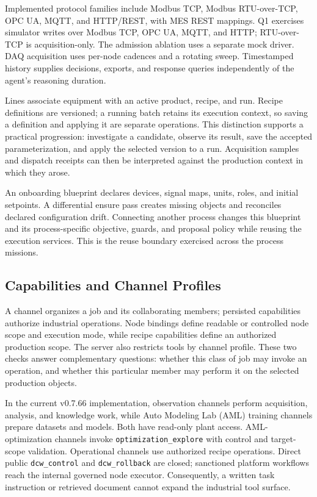 Implemented protocol families include Modbus TCP, Modbus RTU-over-TCP,
OPC UA, MQTT, and HTTP/REST, with MES REST mappings. Q1 exercises simulator
writes over Modbus TCP, OPC UA, MQTT, and HTTP; RTU-over-TCP is
acquisition-only. The admission ablation uses a separate mock driver.
DAQ acquisition uses per-node cadences and a rotating sweep. Timestamped
history supplies decisions, exports, and response queries independently of
the agent's reasoning duration.

Lines associate equipment with an active product, recipe, and run. Recipe
definitions are versioned; a running batch retains its execution context,
so saving a definition and applying it are separate operations. This
distinction supports a practical progression: investigate a candidate,
observe its result, save the accepted parameterization, and apply the
selected version to a run. Acquisition samples and dispatch receipts can
then be interpreted against the production context in which they arose.

An onboarding blueprint declares devices, signal maps, units, roles, and
initial setpoints. A differential ensure pass creates missing objects and
reconciles declared configuration drift. Connecting another process changes
this blueprint and its process-specific objective, guards, and proposal
policy while reusing the execution services. This is the reuse boundary
exercised across the process missions.
\label{sec:reuse}

\subsection{Capabilities and Channel Profiles}
A channel organizes a job and its collaborating members; persisted
capabilities authorize industrial operations. Node bindings define readable
or controlled node scope and execution mode, while recipe capabilities
define an authorized production scope. The server also restricts tools by
channel profile. These two checks answer complementary questions: whether
this class of job may invoke an operation, and whether this particular
member may perform it on the selected production objects.

In the current v0.7.66 implementation, observation channels perform
acquisition, analysis, and knowledge work, while Auto Modeling Lab (AML)
training channels prepare datasets and models. Both have read-only plant
access. AML-optimization channels invoke \texttt{optimization\_explore}
with control and target-scope validation. Operational channels use
authorized recipe operations. Direct public \texttt{dcw\_control} and
\texttt{dcw\_rollback} are closed; sanctioned platform workflows reach the
internal governed node executor. Consequently, a written task instruction
or retrieved document cannot expand the industrial tool surface.

